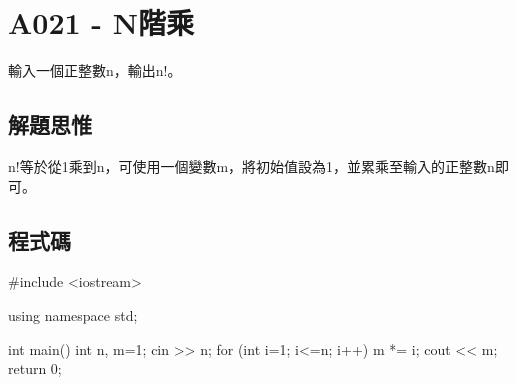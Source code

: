 \section{A021 - N階乘}
輸入一個正整數n，輸出n!。

\subsection{解題思惟}
n!等於從1乘到n，可使用一個變數m，將初始值設為1，並累乘至輸入的正整數n即可。

\subsection{程式碼}
\begin{cppcode}
	#include <iostream>
	
	using namespace std;
	
	int main()
	{
		int n, m=1;
		cin >> n;
		for (int i=1; i<=n; i++) m *= i;
		cout << m;
		return 0;
	}
\end{cppcode}
